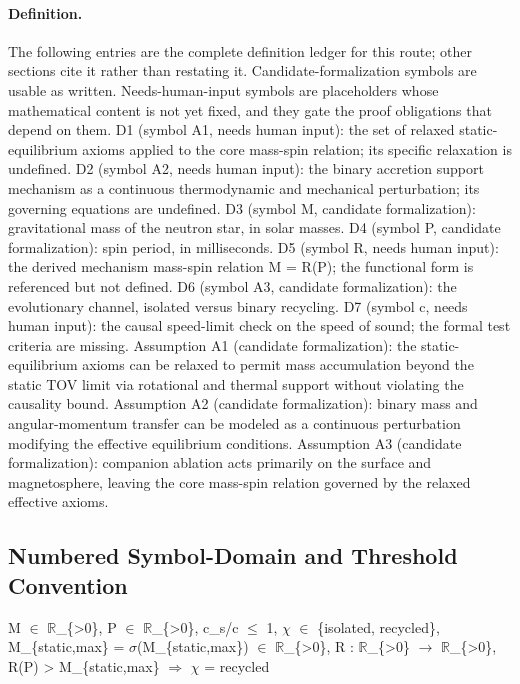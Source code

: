 \documentclass[conference]{IEEEtran}
\begin{document}
\paragraph{Definition.} The following entries are the complete definition ledger for this route; other sections cite it rather than restating it. Candidate-formalization symbols are usable as written. Needs-human-input symbols are placeholders whose mathematical content is not yet fixed, and they gate the proof obligations that depend on them. D1 (symbol A1, needs human input): the set of relaxed static-equilibrium axioms applied to the core mass-spin relation; its specific relaxation is undefined. D2 (symbol A2, needs human input): the binary accretion support mechanism as a continuous thermodynamic and mechanical perturbation; its governing equations are undefined. D3 (symbol M, candidate formalization): gravitational mass of the neutron star, in solar masses. D4 (symbol P, candidate formalization): spin period, in milliseconds. D5 (symbol R, needs human input): the derived mechanism mass-spin relation M = R(P); the functional form is referenced but not defined. D6 (symbol A3, candidate formalization): the evolutionary channel, isolated versus binary recycling. D7 (symbol c, needs human input): the causal speed-limit check on the speed of sound; the formal test criteria are missing. Assumption A1 (candidate formalization): the static-equilibrium axioms can be relaxed to permit mass accumulation beyond the static TOV limit via rotational and thermal support without violating the causality bound. Assumption A2 (candidate formalization): binary mass and angular-momentum transfer can be modeled as a continuous perturbation modifying the effective equilibrium conditions. Assumption A3 (candidate formalization): companion ablation acts primarily on the surface and magnetosphere, leaving the core mass-spin relation governed by the relaxed effective axioms.~\cite{cite_55957f4ce67bd972,cite_c369df652181e8f7,cite_f16cd637681fe829}

\subsection{Numbered Symbol-Domain and Threshold Convention}
M $\in$ $\mathbb{R}$\_\{>0\}, P $\in$ $\mathbb{R}$\_\{>0\}, c\_s/c $\leq$ 1, $\chi$ $\in$ \{isolated, recycled\}, M\_\{static,max\} = $\sigma$(M\_\{static,max\}) $\in$ $\mathbb{R}$\_\{>0\}, R : $\mathbb{R}$\_\{>0\} $\rightarrow$ $\mathbb{R}$\_\{>0\}, R(P) > M\_\{static,max\} $\Rightarrow$ $\chi$ = recycled
\end{document}
